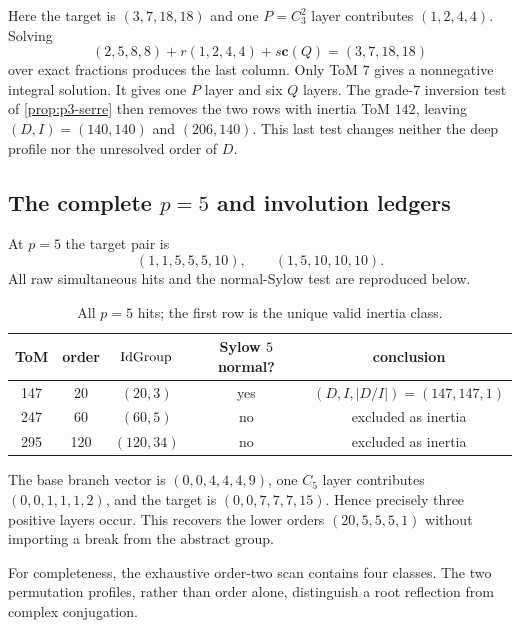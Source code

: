 Here the target is $(3,7,18,18)$ and one $P=C_3^2$ layer contributes
$(1,2,4,4)$.  Solving
\[
 (2,5,8,8)+r(1,2,4,4)+s\mathbf c(Q)=(3,7,18,18)
\]
over exact fractions produces the last column.  Only ToM $7$ gives a
nonnegative integral solution.  It gives one $P$ layer and six $Q$ layers.
The grade-$7$ inversion test of \cref{prop:p3-serre} then removes the two
rows with inertia ToM $142$, leaving $(D,I)=(140,140)$ and $(206,140)$.
This last test changes neither the deep profile nor the unresolved order of
$D$.

\subsection{\texorpdfstring{The complete $p=5$ and involution ledgers}{The complete p=5 and involution ledgers}}

At $p=5$ the target pair is
\[
 (1,1,5,5,5,10),\qquad (1,5,10,10,10).
\]
All raw simultaneous hits and the normal-Sylow test are reproduced below.

\begin{table}[ht]
\centering
\caption{All $p=5$ hits; the first row is the unique valid inertia class.}
\label{tab:app-p5-hits}
\begin{tabular}{@{}c c c c c@{}}
\toprule
ToM&order&$\operatorname{IdGroup}$&Sylow $5$ normal?&conclusion\\
\midrule
147&20&$(20,3)$&yes&$(D,I,|D/I|)=(147,147,1)$\\
247&60&$(60,5)$&no&excluded as inertia\\
295&120&$(120,34)$&no&excluded as inertia\\
\bottomrule
\end{tabular}
\end{table}

The base branch vector is $(0,0,4,4,4,9)$, one $C_5$ layer contributes
$(0,0,1,1,1,2)$, and the target is $(0,0,7,7,7,15)$.  Hence precisely three
positive layers occur.  This recovers the lower orders
$(20,5,5,5,1)$ without importing a break from the abstract group.

For completeness, the exhaustive order-two scan contains four classes.
The two permutation profiles, rather than order alone, distinguish a root
reflection from complex conjugation.

\begin{table}[ht]
\centering
\caption{All order-two subgroup classes in the two labelled actions.}
\label{tab:app-order-two}
\end{table}

